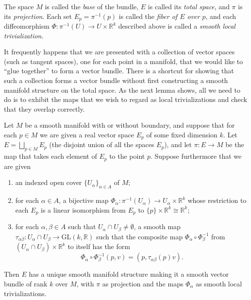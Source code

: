 The space $M$ is called the \emph{base} of the bundle, $E$ is called its \emph{total space}, and $\pi$ is its \emph{projection}. Each set $E_p = \pi^{-1}(p)$ is called the \emph{fiber of $E$ over $p$}, and each diffeomorphism $\Phi : \pi^{-1}(U) \to U \times \mathbb{R}^k$ described above is called a \emph{smooth local trivialization}.

It frequently happens that we are presented with a collection of vector spaces (such as tangent spaces), one for each point in a manifold, that we would like to ``glue together'' to form a vector bundle. There is a shortcut for showing that such a collection forms a vector bundle without first constructing a smooth manifold structure on the total space. As the next lemma shows, all we need to do is to exhibit the maps that we wish to regard as local trivializations and check that they overlap correctly.

\begin{lemma}
\label{lem:vector-bundle-chart-lemma}
Let $M$ be a smooth manifold with or without boundary, and suppose that for each $p \in M$ we are given a real vector space $E_p$ of some fixed dimension $k$. Let $E = \bigsqcup_{p \in M} E_p$ (the disjoint union of all the spaces $E_p$), and let $\pi : E \to M$ be the map that takes each element of $E_p$ to the point $p$. Suppose furthermore that we are given
\begin{enumerate}
\item[(i)] an indexed open cover $\{U_\alpha\}_{\alpha \in A}$ of $M$;
\item[(ii)] for each $\alpha \in A$, a bijective map $\Phi_\alpha : \pi^{-1}(U_\alpha) \to U_\alpha \times \mathbb{R}^k$ whose restriction to each $E_p$ is a linear isomorphism from $E_p$ to $\{p\} \times \mathbb{R}^k \cong \mathbb{R}^k$;
\item[(iii)] for each $\alpha, \beta \in A$ such that $U_\alpha \cap U_\beta \neq \emptyset$, a smooth map $\tau_{\alpha\beta} : U_\alpha \cap U_\beta \to \mathrm{GL}(k,\mathbb{R})$ such that the composite map $\Phi_\alpha \circ \Phi_\beta^{-1}$ from $(U_\alpha \cap U_\beta) \times \mathbb{R}^k$ to itself has the form
\begin{equation}
\Phi_\alpha \circ \Phi_\beta^{-1}(p, v) = (p, \tau_{\alpha\beta}(p)v).
\tag{A.6}
\end{equation}
\end{enumerate}

Then $E$ has a unique smooth manifold structure making it a smooth vector bundle of rank $k$ over $M$, with $\pi$ as projection and the maps $\Phi_\alpha$ as smooth local trivializations.
\end{lemma}

